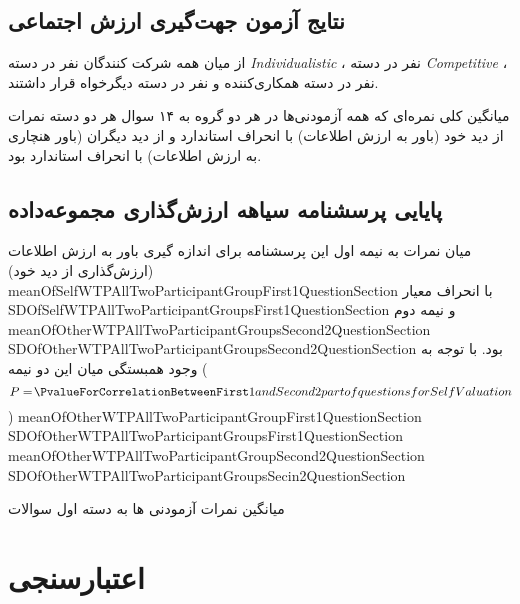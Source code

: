 \subsection{نتایج آزمون جهت‌گیری ارزش اجتماعی}
از میان همه شرکت کنندگان 
\noOfIndividualisticParticipants
نفر در دسته
\textit{
    \gls{Individualistic}
}
،
\noOfCompetitiveParticipants
نفر در دسته
\textit{
    \gls{Competitive}
}
،
\noOfCooperativeParticipants
نفر در دسته
همکاری‌کننده
و
\noOfAltruisticParticipants
نفر در دسته
دیگر‌خواه
قرار داشتند. 

میانگین کلی نمره‌ای که همه آزمودنی‌ها در هر دو گروه به ۱۴ سوال هر دو دسته 
نمرات از دید خود
\!(باور به ارزش اطلاعات)
\meanOfSelfWTPAllTwoParticipantGroupsAllTwoQuestionSection
با انحراف استاندارد
\SDOfSelfWTPAllTwoParticipantGroupsAllTwoQuestionSection
و از دید دیگران
\meanOfOtherWTPAllTwoParticipantGroupsAllTwoQuestionSection
\!(باور هنچاری به ارزش اطلاعات)
با انحراف استاندارد
\SDOfOtherWTPAllTwoParticipantGroupsAllTwoQuestionSection
بود.

\subsection{پایایی پرسشنامه سیاهه ارزش‌گذاری مجموعه‌داده}
میان نمرات به نیمه اول این پرسشنامه برای اندازه گیری 
باور به ارزش اطلاعات
\!(ارزش‌گذاری از دید خود)
meanOfSelfWTPAllTwoParticipantGroupFirst1QuestionSection 
با انحراف معیار
SDOfSelfWTPAllTwoParticipantGroupsFirst1QuestionSection 
و نیمه دوم
meanOfOtherWTPAllTwoParticipantGroupsSecond2QuestionSection
SDOfOtherWTPAllTwoParticipantGroupsSecond2QuestionSection
بود. با توجه به وجود
همبستگی میان این دو نیمه 
($$P=
\!\PvalueForCorrelationBetweenFirst1andSecond2partofquestionsforSelfValuation
\!$$)
meanOfOtherWTPAllTwoParticipantGroupFirst1QuestionSection 
SDOfOtherWTPAllTwoParticipantGroupsFirst1QuestionSection 
meanOfOtherWTPAllTwoParticipantGroupSecond2QuestionSection 
SDOfOtherWTPAllTwoParticipantGroupsSecin2QuestionSection 

میانگین نمرات آزمودنی ها به دسته اول سوالات
\section{اعتبارسنجی}

